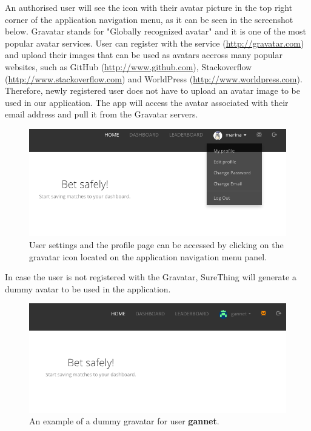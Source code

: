 An authorised user will see the icon with their avatar picture in the top right corner of the application navigation menu, as it can be seen in the screenshot below. Gravatar stands for "Globally recognized avatar" and it is one of the most popular avatar services. User can register with the service (\url{http://gravatar.com}) and upload their images that can be used as avatars accross many popular websites, such as GitHub (\url{http://www.github.com}), Stackoverflow (\url{http://www.stackoverflow.com}) and WorldPress (\url{http://www.worldpress.com}). Therefore, newly registered user does not have to upload an avatar image to be used in our application. The app will access the avatar associated with their email address and pull it from the Gravatar servers. 

\begin{figure}[H]
	\begin{center}
		\includegraphics[width=.90\columnwidth]{impl/images/gravatar}
		\caption{User settings and the profile page can be accessed by clicking on the gravatar icon located on the application navigation menu panel.} \label{fig:gravatar}
	\end{center}
\end{figure}

In case the user is not registered with the Gravatar, SureThing will generate a dummy avatar to be used in the application.

\begin{figure}[H]
	\begin{center}
		\includegraphics[width=.90\columnwidth]{impl/images/dummyGravatar}
		\caption{An example of a dummy gravatar for user \textbf{gannet}.} \label{fig:dummygravatar}
	\end{center}
\end{figure}

